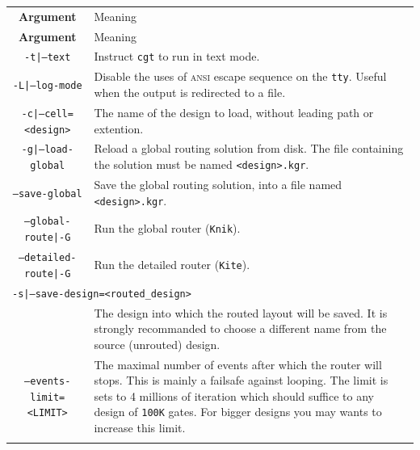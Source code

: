 \documentclass[11pt]{article}
\newcommand {\ANSI}               {\textsc{ansi}\xspace}
\newcommand {\tty}                {\texttt{tty}\xspace}
\newcommand {\Knik}               {\texttt{Knik}\xspace}
\newcommand {\Kite}               {\texttt{Kite}\xspace}
\newcommand {\cgt}                {\texttt{cgt}\xspace}
\begin{document}
  \begin{center}
  \begin{longtable}{|c|p{}|}
      \hline
      \textbf{Argument} & Meaning \\
      \latex{\hline}
      \hline
    \endfirsthead
      \hline
      \textbf{Argument} & Meaning \\
      \latex{\hline}
      \hline
    \endhead
      \hline
    \endfoot
    \endlastfoot
    \latex{\hline}
    \texttt{-t|--text}
      & Instruct \cgt to run in text mode. \\
    \hline
    \texttt{-L|--log-mode}
      & Disable the uses of \ANSI escape sequence on the \tty. Useful when
        the output is redirected to a file. \\
    \hline
    \texttt{-c|--cell=<design>}
      & The name of the design to load, without leading path or
        extention. \\
    \hline
    \texttt{-g|--load-global}
      & Reload a global routing solution from disk. \linebreak
        The file containing the solution must be named \texttt{<design>.kgr}. \\
    \hline
    \texttt{--save-global}
      & Save the global routing solution, into a file named \texttt{<design>.kgr}. \\
    \hline
    \texttt{--global-route|-G}
      & Run the global router (\Knik). \\
    \hline
    \texttt{--detailed-route|-G}
      & Run the detailed router (\Kite). \\
    \hline
    \multicolumn{2}{|l|}{\texttt{-s|--save-design=<routed\_design>}} \\
    \cline{1-1}
      & The design into which the routed layout will be saved. It is strongly
        recommanded to choose a different name from the source (unrouted)
        design. \\
    \hline
    \texttt{--events-limit=<LIMIT>}
      & The maximal number of events after which the router will stops. This is
        mainly a failsafe against looping. The limit is sets to 4 millions of
        iteration which should suffice to any design of \texttt{100K}\xspace
        gates. For bigger designs you may wants to increase this limit. \\
    \latex{\hline}
  \end{longtable}
  \end{center}
\end{document}
